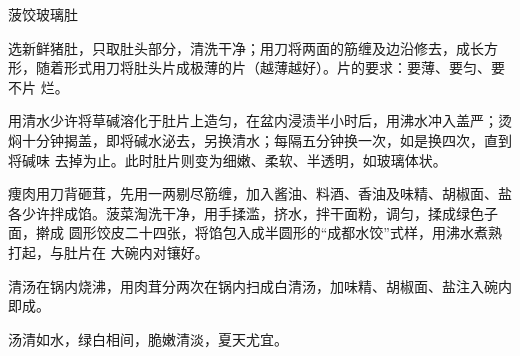 \begin{recipe}{菠饺玻璃肚}

\ingredients


\preparation

\step 选新鲜猪肚，只取肚头部分，清洗干净；用刀将两面的筋缠及边沿修去，成长方
形，随着形式用刀将肚头片成极薄的片（越薄越好）。片的要求：要薄、要匀、要不片
烂。

\step 用清水少许将草碱溶化于肚片上造匀，在盆内浸渍半小时后，用沸水冲入盖严；烫
焖十分钟揭盖，即将碱水泌去，另换清水；每隔五分钟换一次，如是换四次，直到将碱味
去掉为止。此时肚片则变为细嫩、柔软、半透明，如玻璃体状。

\step 痩肉用刀背砸茸，先用一两剔尽筋缠，加入酱油、料酒、香油及味精、胡椒面、盐
各少许拌成馅。菠菜淘洗干净，用手揉滥，挤水，拌干面粉，调匀，揉成绿色子面，擀成
圆形饺皮二十四张，将馅包入成半圆形的“成都水饺”式样，用沸水煮熟打起，与肚片在
大碗内对镶好。

\step 清汤在锅内烧沸，用肉茸分两次在锅内扫成白清汤，加味精、胡椒面、盐注入碗内
即成。

\features

汤清如水，绿白相间，脆嫩清淡，夏天尤宜。

\end{recipe}

